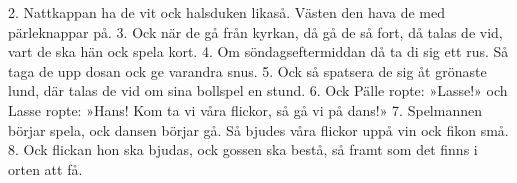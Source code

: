 2.  Nattkappan ha de vit ock halsduken likaså.
    Västen den hava de med pärleknappar på.
3.  Ock när de gå från kyrkan, då gå de så fort,
    då talas de vid, vart de ska hän ock spela kort.
4.  Om söndagseftermiddan då ta di sig ett rus.
    Så taga de upp dosan ock ge varandra snus.
5.  Ock så spatsera de sig åt grönaste lund,
    där talas de vid om sina bollspel en stund.
6.  Ock Pälle ropte: »Lasse!» och Lasse ropte: »Hans!
    Kom ta vi våra flickor, så gå vi på dans!»
7.  Spelmannen börjar spela, ock dansen börjar gå.
    Så bjudes våra flickor uppå vin ock fikon små.
8.  Ock flickan hon ska bjudas, ock gossen ska bestå,
    så framt som det finns i orten att få.
